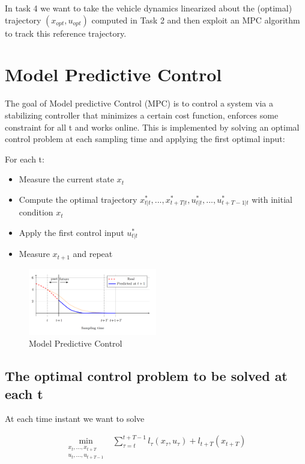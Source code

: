 In task 4 we want to take the vehicle dynamics linearized about the (optimal) trajectory $(x_{opt}, u_{opt})$ computed in
Task 2 and then exploit an MPC algorithm to track this reference trajectory.

\section{Model Predictive Control}

The goal of Model predictive Control (MPC) is to control a system via a stabilizing controller that minimizes a certain cost function, enforces some constraint for all t and works online. This is implemented by solving an optimal control problem at each sampling time and applying the first optimal input: 

For each t: 
\begin{itemize}
    \item Measure the current state $x_t$
    \item Compute the optimal trajectory $x^{*}_{t|t},..., x^{*}_{t+T|t}, u^{*}_{t|t}, ..., u^{*}_{t+T-1|t}$ with initial condition $x_t$
    \item Apply the first control input $u^{*}_{t|t}$
    \item Measure $x_{t+1}$ and repeat
\end{itemize}

\begin{figure}[htp]
\centering
\includegraphics[width=0.5\textwidth]{pictures/MPC}
\caption{Model Predictive Control}
\label{fig:MPC}
\end{figure}


\subsection{The optimal control problem to be solved at each t}

At each time instant we want to solve

\begin{align*}
\min_{\substack{x_t,...,x_{t+T} \\ u_t,...,u_{t+T-1}}} &\sum_{\tau=t}^{t+T-1} l_\tau (x_\tau, u_\tau) + l_{t+T}(x_{t+T})
\end{align*}

